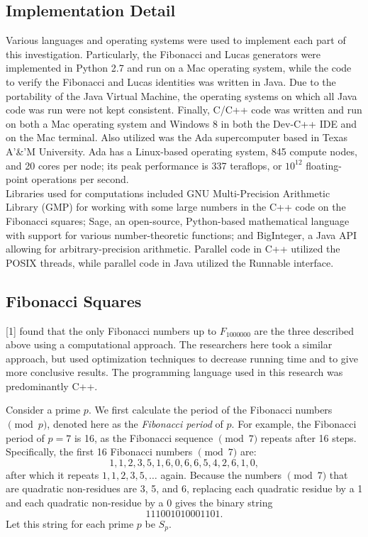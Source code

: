 \documentclass[11pt]{article}
\begin{document}
\subsection{Implementation Detail}
Various languages and operating systems were used to implement each part of this investigation. Particularly, the Fibonacci and Lucas generators were implemented in Python 2.7 and run on a Mac operating system, while the code to verify the Fibonacci and Lucas identities was written in Java. Due to the portability of the Java Virtual Machine, the operating systems on which all Java code was run were not kept consistent. Finally, C/C++ code was written and run on both a Mac operating system and Windows 8 in both the Dev-C++ IDE and on the Mac terminal. Also utilized was the Ada supercomputer based in Texas A'\&'M University. Ada has a Linux-based operating system, 845 compute nodes, and 20 cores per node; its peak performance is 337 teraflops, or $10^{12}$ floating-point operations per second. \\
Libraries used for computations included GNU Multi-Precision Arithmetic Library (GMP) for working with some large numbers in the C++ code on the Fibonacci squares; Sage, an open-source, Python-based mathematical language with support for various number-theoretic functions; and BigInteger, a Java API allowing for arbitrary-precision arithmetic. Parallel code in C++ utilized the POSIX threads, while parallel code in Java utilized the Runnable interface.
\subsection{Fibonacci Squares}
[1] found that the only Fibonacci numbers up to $F_{1000000}$ are the three described above using a computational approach. The researchers here took a similar approach, but used optimization techniques to decrease running time and to give more conclusive results. The programming language used in this research was predominantly C++.


Consider a prime $p$. We first calculate the period of the Fibonacci numbers $\pmod p$, denoted here as the \textit{Fibonacci period} of $p$. For example, the Fibonacci period of $p = 7$ is 16, as the Fibonacci sequence $\pmod 7$ repeats after 16 steps. Specifically, the first 16 Fibonacci numbers $\pmod{7}$ are: \[ 1, 1, 2, 3, 5, 1, 6, 0, 6, 6, 5, 4, 2, 6, 1, 0, \] after which it repeats $1, 1, 2, 3, 5, \dots$ again. Because the numbers $\pmod{7}$ that are quadratic non-residues are 3, 5, and 6, replacing each quadratic residue by a 1 and each quadratic non-residue by a 0 gives the binary string \[111001010001101.\] Let this string for each prime $p$ be $S_p$. 
\end{document}
